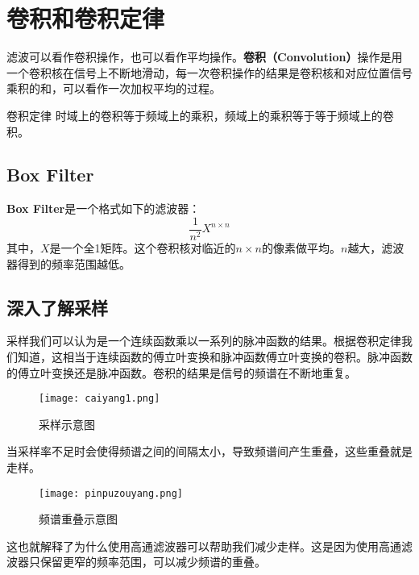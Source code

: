 \documentclass[openany]{progbookcn}
\begin{document}
\section{卷积和卷积定律}
滤波可以看作卷积操作，也可以看作平均操作。\textbf{卷积（Convolution）}操作是用一个卷积核在信号上不断地滑动，每一次卷积操作的结果是卷积核和对应位置信号乘积的和，可以看作一次加权平均的过程。

\begin{titledbox}{卷积定律}
	\centering 时域上的卷积等于频域上的乘积，频域上的乘积等于等于频域上的卷积。
\end{titledbox}

\subsection{Box Filter}
\textbf{Box Filter}是一个格式如下的滤波器：
\begin{equation}
	\frac{1}{n^2} X^{n\times n}
\end{equation}
其中，$X$是一个全1矩阵。这个卷积核对临近的$n\times n$的像素做平均。$n$越大，滤波器得到的频率范围越低。

\subsection{深入了解采样}
采样我们可以认为是一个连续函数乘以一系列的脉冲函数的结果。根据卷积定律我们知道，这相当于连续函数的傅立叶变换和脉冲函数傅立叶变换的卷积。脉冲函数的傅立叶变换还是脉冲函数。卷积的结果是信号的频谱在不断地重复。

\begin{figure}[H]
	\centering
	\texttt{[image: caiyang1.png]}
	\caption{采样示意图}
	\label{fig:caiyang}
\end{figure}
当采样率不足时会使得频谱之间的间隔太小，导致频谱间产生重叠，这些重叠就是走样。

\begin{figure}[H]
	\centering
	\texttt{[image: pinpuzouyang.png]}
	\caption{频谱重叠示意图}
	\label{fig:pinpuzouyang}
\end{figure}

这也就解释了为什么使用高通滤波器可以帮助我们减少走样。这是因为使用高通滤波器只保留更窄的频率范围，可以减少频谱的重叠。
\end{document}
